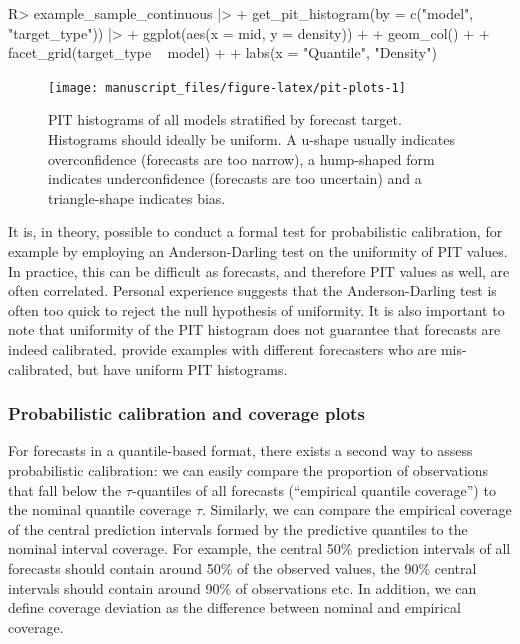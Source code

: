 \documentclass[
]{jss}
\begin{document}
\begin{CodeChunk}
\begin{CodeInput}
R> example_sample_continuous |>
+   get_pit_histogram(by = c("model", "target_type")) |>
+   ggplot(aes(x = mid, y = density)) +
+   geom_col() +
+   facet_grid(target_type ~ model) +
+   labs(x = "Quantile", "Density")
\end{CodeInput}
\begin{figure}[!h]

{\centering \texttt{[image: manuscript\_files/figure-latex/pit-plots-1]} 

}

\caption[PIT histograms of all models stratified by forecast target]{PIT histograms of all models stratified by forecast target. Histograms should ideally be uniform. A u-shape usually indicates overconfidence (forecasts are too narrow), a hump-shaped form indicates underconfidence (forecasts are too uncertain) and a triangle-shape indicates bias.}\label{fig:pit-plots}
\end{figure}
\end{CodeChunk}

It is, in theory, possible to conduct a formal test for probabilistic
calibration, for example by employing an Anderson-Darling test on the
uniformity of PIT values. In practice, this can be difficult as
forecasts, and therefore PIT values as well, are often correlated.
Personal experience suggests that the Anderson-Darling test is often too
quick to reject the null hypothesis of uniformity. It is also important
to note that uniformity of the PIT histogram does not guarantee that
forecasts are indeed calibrated.
\cite{gneitingProbabilisticForecastsCalibration2007, hamillInterpretationRankHistograms2001a}
provide examples with different forecasters who are mis-calibrated, but
have uniform PIT histograms.

\subsubsection{Probabilistic calibration and coverage
plots}\label{probabilistic-calibration-and-coverage-plots}

For forecasts in a quantile-based format, there exists a second way to
assess probabilistic calibration: we can easily compare the proportion
of observations that fall below the \(\tau\)-quantiles of all forecasts
(``empirical quantile coverage'') to the nominal quantile coverage
\(\tau\). Similarly, we can compare the empirical coverage of the
central prediction intervals formed by the predictive quantiles to the
nominal interval coverage. For example, the central 50\% prediction
intervals of all forecasts should contain around 50\% of the observed
values, the 90\% central intervals should contain around 90\% of
observations etc. In addition, we can define coverage deviation as the
difference between nominal and empirical coverage.
\end{document}
